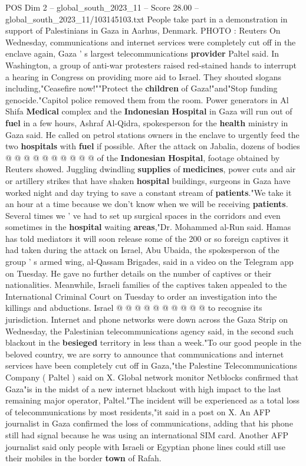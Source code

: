 \begin{textsample}{POS Dim 2 – global\_south\_2023\_11 – Score 28.00 – global\_south\_2023\_11/103145103.txt}
People take part in a demonstration in support of Palestinians in Gaza in Aarhus, Denmark.
PHOTO : Reuters On Wednesday, communications and internet services were completely cut off in the enclave again, Gaza ' s largest telecommunications \textbf{provider} Paltel said.
In Washington, a group of anti-war protesters raised red-stained hands to interrupt a hearing in Congress on providing more aid to Israel.
They shouted slogans including,"Ceasefire now!""Protect the \textbf{children} of Gaza!"and"Stop funding genocide."Capitol police removed them from the room.
Power generators in Al Shifa \textbf{Medical} complex and the \textbf{Indonesian} \textbf{Hospital} in Gaza will run out of \textbf{fuel} in a few hours, Ashraf Al-Qidra, spokesperson for the \textbf{health} ministry in Gaza said.
He called on petrol stations owners in the enclave to urgently feed the two \textbf{hospitals} with \textbf{fuel} if possible.
After the attack on Jabalia, dozens of bodies @ @ @ @ @ @ @ @ @ @ of the \textbf{Indonesian} \textbf{Hospital}, footage obtained by Reuters showed.
Juggling dwindling \textbf{supplies} of \textbf{medicines}, power cuts and air or artillery strikes that have shaken \textbf{hospital} buildings, surgeons in Gaza have worked night and day trying to save a constant stream of \textbf{patients}."We take it an hour at a time because we don't know when we will be receiving \textbf{patients}.
Several times we ' ve had to set up surgical spaces in the corridors and even sometimes in the \textbf{hospital} waiting \textbf{areas},"Dr.
Mohammed al-Run said.
Hamas has told mediators it will soon release some of the 200 or so foreign captives it had taken during the attack on Israel, Abu Ubaida, the spokesperson of the group ' s armed wing, al-Qassam Brigades, said in a video on the Telegram app on Tuesday.
He gave no further details on the number of captives or their nationalities.
Meanwhile, Israeli families of the captives taken appealed to the International Criminal Court on Tuesday to order an investigation into the killings and abductions.
Israel @ @ @ @ @ @ @ @ @ @ to recognise its jurisdiction.
Internet and phone networks were down across the Gaza Strip on Wednesday, the Palestinian telecommunications agency said, in the second such blackout in the \textbf{besieged} territory in less than a week."To our good people in the beloved country, we are sorry to announce that communications and internet services have been completely cut off in Gaza,"the Palestine Telecommunications Company ( Paltel ) said on X.
Global network monitor Netblocks confirmed that Gaza"is in the midst of a new internet blackout with high impact to the last remaining major operator, Paltel."The incident will be experienced as a total loss of telecommunications by most residents,"it said in a post on X.
An AFP journalist in Gaza confirmed the loss of communications, adding that his phone still had signal because he was using an international SIM card.
Another AFP journalist said only people with Israeli or Egyptian phone lines could still use their mobiles in the border \textbf{town} of Rafah.


\end{textsample}
